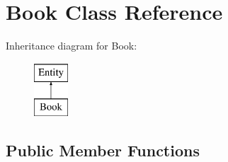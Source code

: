 \hypertarget{classBook}{
\section{Book Class Reference}
\label{classBook}
}
Inheritance diagram for Book:\begin{figure}[H]
\begin{center}
\leavevmode
\includegraphics[height=2.000000cm]{classBook}
\end{center}
\end{figure}
\subsection*{Public Member Functions}
